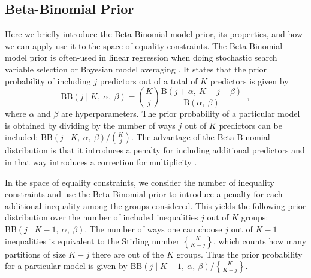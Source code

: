 \documentclass[11pt,a4paper]{article}
\theoremstyle{definition} %
\theoremstyle{case}
\newcommand{\FBeta}[2]{\text{B}\left({#1},\ {#2}\right)}
\newcommand{\BetaBinom}[4]{\text{BB}\left(#1 \mid #2 ,\ #3 ,\ #4 \right)}
\DeclareRobustCommand{\stirling}{\genfrac\{\}{0pt}{}}
\begin{document}
\subsection{Beta-Binomial Prior}
Here we briefly introduce the Beta-Binomial model prior, its properties, and how we can apply use it to the space of equality constraints. The Beta-Binomial model prior is often-used in linear regression when doing stochastic search variable selection \parencite[][]{george1993variable} or Bayesian model averaging \parencite[e.g.,][]{hinne2020conceptual, hoeting1999bayesian}. It states that the prior probability of including $j$ predictors out of a total of $K$ predictors is given by
\begin{equation}
    \BetaBinom{j}{K}{\alpha}{\beta} = \binom{K}{j} \frac{\FBeta{j + \alpha}{K - j + \beta}}{\FBeta{\alpha}{\beta}} \enspace ,
\end{equation}
where $\alpha$ and $\beta$ are hyperparameters. The prior probability of a particular model is obtained by dividing by the number of ways $j$ out of $K$ predictors can be included: $\BetaBinom{j}{K}{\alpha}{\beta} / \binom{K}{j}$. The advantage of the Beta-Binomial distribution is that it introduces a penalty for including additional predictors and in that way introduces a correction for multiplicity \parencite{scott2006exploration, scott2010bayes}.

In the space of equality constraints, we consider the number of inequality constraints and use the Beta-Binomial prior to introduce a penalty for each additional inequality among the groups considered. This yields the following prior distribution over the number of included inequalities $j$ out of $K$ groups: $\BetaBinom{j}{K-1}{\alpha}{\beta}$. The number of ways one can choose $j$ out of $K-1$ inequalities is equivalent to the Stirling number $\stirling{K}{K-j}$, which counts how many partitions of size $K - j$ there are out of the $K$ groups. Thus the prior probability for a particular model is given by $\BetaBinom{j}{K-1}{\alpha}{\beta} / \stirling{K}{K-j}$.
\end{document}
